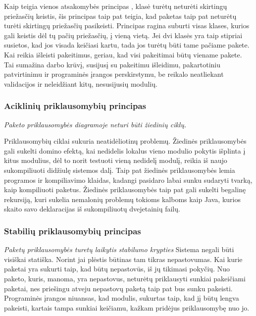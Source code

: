 Kaip teigia vienos atsakomybės principas , klasė turėtų neturėti skirtingų priežasčių keistis,
šis principas taip pat teigia, kad paketas taip pat neturėtų turėti skirtingų priežasčių pasikeisti.
Principas ragina suburti visas klases, kurios gali keistis dėl tų pačių priežasčių, į vieną vietą.
Jei dvi klasės yra taip stipriai susietos, kad jos visada keičiasi kartu, tada
jos turėtų būti tame pačiame pakete.
Kai reikia išleisti pakeitimus, geriau, kad visi pakeitimai būtų viename pakete.
Tai sumažina darbo krūvį, susijusį su pakeitimu išleidimu, pakartotiniu patvirtinimu ir programinės įrangos perskirstymu,
be reikalo neatliekant validacijos ir neleidžiant kitų, nesusijusių modulių\cite{AgileSoftwareDevelopment}.

\subsubsection{Aciklinių priklausomybių principas}
\textit{Paketo priklausomybės diagramoje neturi būti žiedinių ciklų.}

Priklausomybių ciklai sukuria neatidėliotinų problemų.
Žiedinės priklausomybės gali sukelti domino efektą, kai nedidelis lokalus vieno modulio pokytis išplinta į kitus modulius,
dėl to norit testuoti vieną nedidelį modulį, reikia iš naujo sukompiliuoti didžiulę sistemos dalį.
Taip pat žiedinės priklausomybės lemia programos ir kompiliavimo klaidas, kadangi pasidaro labai sunku sudaryti tvarką, kaip kompiliuoti paketus.
Žiedinės priklausomybės taip pat gali sukelti begalinę rekursiją,
kuri sukelia nemalonių problemų tokioms kalboms kaip Java, kurios skaito savo deklaracijas iš
sukompiliuotų dvejetainių failų\cite{AgileSoftwareDevelopment}.


\subsubsection{Stabilių priklausomybių principas}
\textit{Paketų priklausomybės turetų laikytis stabilumo krypties}
Sistema negali būti visiškai statiška.
Norint jai plėstis būtinas tam tikras nepastovumas.
Kai kurie paketai yra sukurti taip, kad būtų nepastovūs, iš jų tikimasi pokyčių.
Nuo paketo, kuris, manoma, yra nepastovus, neturėtų priklausyti sunkiai pakeičiami paketai,
nes priešingu atveju nepastovų paketą taip pat bus sunku pakeisti.
Programinės įrangos niuansas, kad modulis, sukurtas taip, kad jį būtų lengva pakeisti, kartais tampa sunkiai keičiamu, kažkam
 pridėjus priklausomybę nuo jo\cite{AgileSoftwareDevelopment}.


